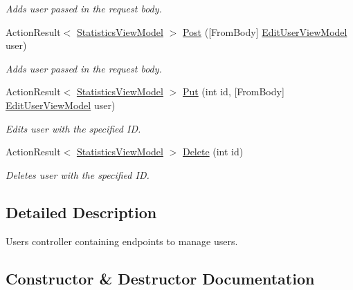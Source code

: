 \begin{DoxyCompactItemize}
\begin{DoxyCompactList}\small\item\em Adds user passed in the request body. \end{DoxyCompactList}\item 
Action\+Result$<$ \mbox{\hyperlink{class_gielda_l2_1_1_a_p_i_1_1_view_models_1_1_view_1_1_statistics_view_model}{Statistics\+View\+Model}} $>$ \mbox{\hyperlink{class_gielda_l2_1_1_a_p_i_1_1_controllers_1_1_users_controller_a75e8fafc661b2159421b40427f627a92}{Post}} (\mbox{[}From\+Body\mbox{]} \mbox{\hyperlink{class_gielda_l2_1_1_a_p_i_1_1_view_models_1_1_edit_1_1_edit_user_view_model}{Edit\+User\+View\+Model}} user)
\begin{DoxyCompactList}\small\item\em Adds user passed in the request body. \end{DoxyCompactList}\item 
Action\+Result$<$ \mbox{\hyperlink{class_gielda_l2_1_1_a_p_i_1_1_view_models_1_1_view_1_1_statistics_view_model}{Statistics\+View\+Model}} $>$ \mbox{\hyperlink{class_gielda_l2_1_1_a_p_i_1_1_controllers_1_1_users_controller_abe00d21f9abb32cb07ada5815bec4e0a}{Put}} (int id, \mbox{[}From\+Body\mbox{]} \mbox{\hyperlink{class_gielda_l2_1_1_a_p_i_1_1_view_models_1_1_edit_1_1_edit_user_view_model}{Edit\+User\+View\+Model}} user)
\begin{DoxyCompactList}\small\item\em Edits user with the specified ID. \end{DoxyCompactList}\item 
Action\+Result$<$ \mbox{\hyperlink{class_gielda_l2_1_1_a_p_i_1_1_view_models_1_1_view_1_1_statistics_view_model}{Statistics\+View\+Model}} $>$ \mbox{\hyperlink{class_gielda_l2_1_1_a_p_i_1_1_controllers_1_1_users_controller_afab7b766c848638cb06d1a668a7f417c}{Delete}} (int id)
\begin{DoxyCompactList}\small\item\em Deletes user with the specified ID. \end{DoxyCompactList}\end{DoxyCompactItemize}


\subsection{Detailed Description}
Users controller containing endpoints to manage users. 



\subsection{Constructor \& Destructor Documentation}
\mbox{\label{class_gielda_l2_1_1_a_p_i_1_1_controllers_1_1_users_controller_a71d11bc5956c6dc52711977870a28f16}} 
